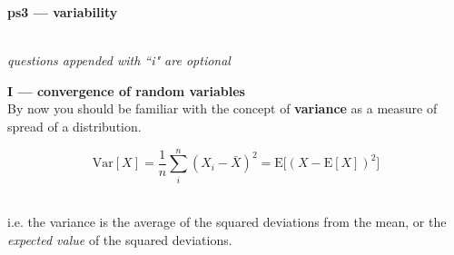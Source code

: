 \documentclass[10pt]{extarticle}
\newcommand{\E}{\text{E}}
\newcommand{\Var}{\text{Var}}
\begin{document}
\setlength{\parindent}{0pt}





{\bf \huge ps3 --- variability}

\hrulefill \\

{\it questions appended with ``i" are optional} \\

\hfill





{\bf \Large I --- convergence of random variables}  \\

By now you should be familiar with the concept of {\bf variance} as a measure of spread of a distribution. 

$$\Var[X] = \frac 1n \sum_i^n (X_i - \bar X)^2 = \E \big[ (X - \E[X])^2 \big]$$ \ 

i.e. the variance is the average of the squared deviations from the mean, or the {\it expected value} of the squared deviations.  

\hfill 
\end{document}
